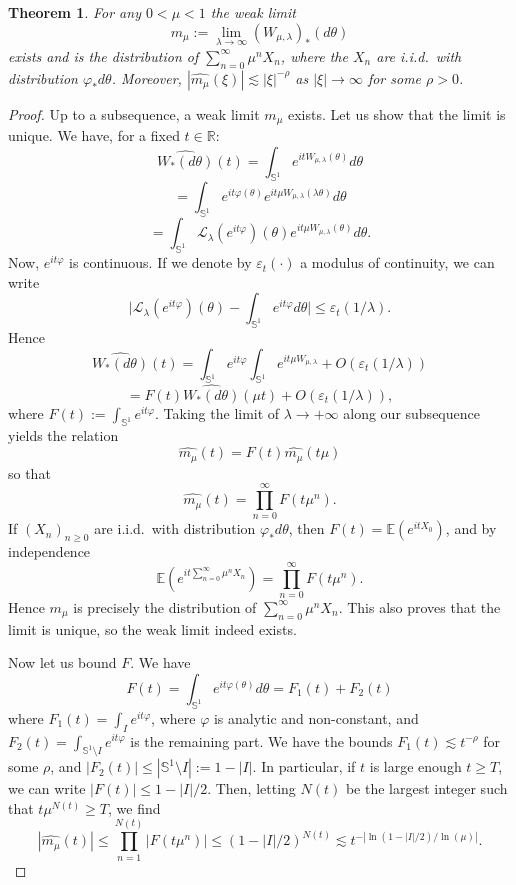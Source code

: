 \documentclass[11pt]{amsart}
\theoremstyle{plain}
\newtheorem{theorem}{Theorem}[section]
\theoremstyle{definition}
\numberwithin{equation}{section}
\begin{document}
\begin{theorem}
For any $0 < \mu < 1$ the weak limit
\[
m_\mu:=\lim_{\lambda\to\infty}(W_{\mu,\lambda})_*(d\theta)
\]
exists and is the distribution of $\sum_{n=0}^\infty\mu^nX_n$, where the $X_n$ are i.i.d.\ with distribution $\varphi_*d\theta$. Moreover, $|\widehat{m_\mu}(\xi)|\lesssim|\xi|^{-\rho}$ as $|\xi|\to\infty$ for some $\rho>0$.
\end{theorem}

\begin{proof}
Up to a subsequence, a weak limit $m_\mu$ exists. Let us show that the limit is unique. We have, for a fixed $t \in \mathbb{R}$:
$$ \widehat{W_* (d\theta)}(t) = \int_{\mathbb{S}^1} e^{i t W_{\mu,\lambda}(\theta)} d\theta $$
$$ = \int_{\mathbb{S}^1} e^{i t \varphi(\theta)} e^{it \mu W_{\mu,\lambda}(\lambda \theta)} d\theta $$
$$ = \int_{\mathbb{S}^1} \mathcal{L}_\lambda( e^{i t \varphi})(\theta) e^{it \mu W_{\mu,\lambda}(\theta)} d\theta. $$
Now, $e^{i t \varphi}$ is continuous. If we denote by $\varepsilon_t(\cdot)$ a modulus of continuity, we can write
$$ \Big| \mathcal{L}_\lambda(e^{it \varphi})(\theta) - \int_{\mathbb{S}^1} e^{i t \varphi} d\theta \Big| \leq \varepsilon_t(1/\lambda) .$$
Hence
$$ \widehat{W_*(d\theta)}(t) = \int_{\mathbb{S}^1} e^{it \varphi} \int_{\mathbb{S}^1} e^{it\mu W_{\mu,\lambda}} + O(\varepsilon_t(1/\lambda)) $$
$$ = F(t) \widehat{W_* (d\theta)}(\mu t) + O(\varepsilon_t(1/\lambda)), $$
where $F(t) := \int_{\mathbb{S}^1} e^{i t \varphi}$. Taking the limit of $\lambda \rightarrow +\infty$ along our subsequence yields the relation
$$ \widehat{m_\mu}(t) = F(t)\widehat{m_\mu}(t\mu) $$
so that
$$ \widehat{m_\mu}(t) = \prod_{n=0}^\infty F(t \mu^n). $$
If $(X_n)_{n\geq0}$ are i.i.d.\ with distribution $\varphi_*d\theta$, then $F(t)=\mathbb E(e^{itX_0})$, and by independence
$$ \mathbb E\left(e^{it\sum_{n=0}^\infty\mu^nX_n}\right)=\prod_{n=0}^\infty F(t\mu^n). $$
Hence $m_\mu$ is precisely the distribution of $\sum_{n=0}^\infty\mu^nX_n$. This also proves that the limit is unique, so the weak limit indeed exists.

Now let us bound $F$. We have
$$ F(t) = \int_{\mathbb{S}^1} e^{it \varphi(\theta)} d\theta = F_1(t) + F_2(t) $$
where $F_1(t) = \int_{I} e^{it \varphi}$, where $\varphi$ is analytic and non-constant, and $F_2(t) = \int_{\mathbb{S}^1 \setminus I} e^{it \varphi}$ is the remaining part. We have the bounds $F_1(t) \lesssim t^{-\rho}$ for some $\rho$, and $|F_2(t)| \leq |\mathbb{S}^1 \setminus I| := 1-|I|$. In particular, if $t$ is large enough $t \geq T$, we can write $|F(t)| \leq 1-|I|/2$. Then, letting $N(t)$ be the largest integer such that $t \mu^{N(t)} \geq T$, we find
$$ |\widehat{m_\mu}(t)| \leq \prod_{n=1}^{N(t)} |F(t \mu^n)| \leq (1-|I|/2)^{N(t)} \lesssim t^{- |\ln(1-|I|/2)/\ln(\mu)|} .$$
\end{proof}
\end{document}
